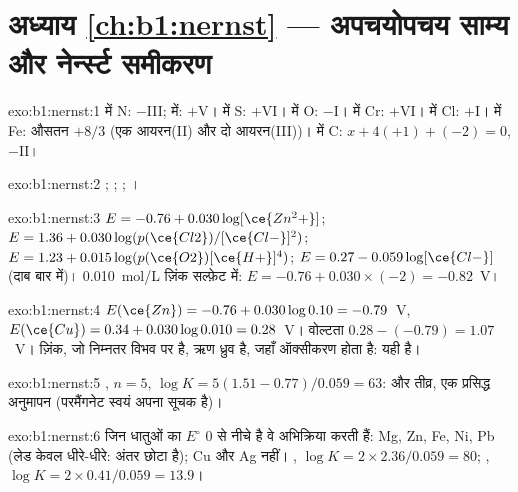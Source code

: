\section*{अध्याय \ref{ch:b1:nernst} --- अपचयोपचय साम्य और नेर्न्स्ट समीकरण}

\begin{solution}{exo:b1:nernst:1}
 में N: $-$III;  में: $+$V।  में S: $+$VI।
 में O: $-$I।  में Cr: $+$VI।  में Cl: $+$I।
 में Fe: औसतन $+8/3$ (एक आयरन(II) और दो आयरन(III))।
 में C: $x + 4(+1) + (-2) = 0$, $-$II।
\end{solution}

\begin{solution}{exo:b1:nernst:2}
;
;
;
।
\end{solution}

\begin{solution}{exo:b1:nernst:3}
$E = -0.76 + 0.030\log[\ce{Zn^2+}]$; $E = 1.36 + 0.030\log(p(\ce{Cl2})/[\ce{Cl-}]^2)$;
$E = 1.23 + 0.015\log(p(\ce{O2})[\ce{H+}]^4)$; $E = 0.27 - 0.059\log[\ce{Cl-}]$
(दाब बार में)। \qty{0.010}{mol/L} ज़िंक सल्फ़ेट में:
$E = -0.76 + 0.030 \times (-2) = -0.82$~V।
\end{solution}

\begin{solution}{exo:b1:nernst:4}
$E(\ce{Zn}) = -0.76 + 0.030\log 0.10 = -0.79$~V, $E(\ce{Cu}) = 0.34 +
0.030\log 0.010 = 0.28$~V। वोल्टता $0.28 - (-0.79) = 1.07$~V। ज़िंक, जो
निम्नतर विभव पर है, ऋण ध्रुव है, जहाँ ऑक्सीकरण होता है: यही
 है।
\end{solution}

\begin{solution}{exo:b1:nernst:5}
, $n = 5$,
$\log K = 5(1.51 - 0.77)/0.059 = 63$:  और तीव्र, एक प्रसिद्ध
अनुमापन (परमैंगनेट स्वयं अपना सूचक है)।
\end{solution}

\begin{solution}{exo:b1:nernst:6}
जिन धातुओं का $E^\circ$ 0 से नीचे है वे अभिक्रिया करती हैं: Mg, Zn, Fe, Ni, Pb (लेड केवल
धीरे-धीरे: अंतर छोटा है); Cu और Ag नहीं। , $\log K = 2 \times 2.36/0.059 = 80$;
, $\log K = 2 \times 0.41/0.059 = 13.9$।
\end{solution}

